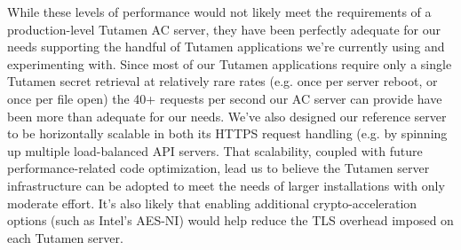 While these levels of performance would not likely meet the
requirements of a production-level Tutamen AC server, they have been
perfectly adequate for our needs supporting the handful of Tutamen
applications we're currently using and experimenting with. Since most
of our Tutamen applications require only a single Tutamen secret
retrieval at relatively rare rates (e.g. once per server reboot, or
once per file open) the 40+ requests per second our AC server can
provide have been more than adequate for our needs. We've also
designed our reference server to be horizontally scalable in both its
HTTPS request handling (e.g. by spinning up multiple load-balanced API
servers. That scalability, coupled with future performance-related
code optimization, lead us to believe the Tutamen server
infrastructure can be adopted to meet the needs of larger
installations with only moderate effort. It's also likely that
enabling additional crypto-acceleration options (such as Intel's
AES-NI) would help reduce the TLS overhead imposed on each Tutamen
server.

